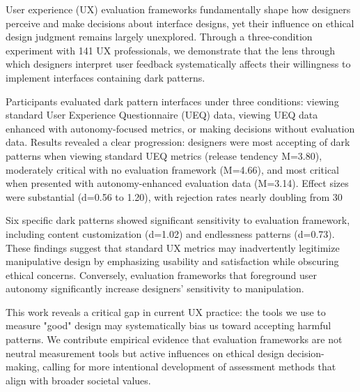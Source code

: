 
User experience (UX) evaluation frameworks fundamentally shape how designers perceive and make decisions about interface designs, yet their influence on ethical design judgment remains largely unexplored. Through a three-condition experiment with 141 UX professionals, we demonstrate that the lens through which designers interpret user feedback systematically affects their willingness to implement interfaces containing dark patterns. 

Participants evaluated dark pattern interfaces under three conditions: viewing standard User Experience Questionnaire (UEQ) data, viewing UEQ data enhanced with autonomy-focused metrics, or making decisions without evaluation data. Results revealed a clear progression: designers were most accepting of dark patterns when viewing standard UEQ metrics (release tendency M=3.80), moderately critical with no evaluation framework (M=4.66), and most critical when presented with autonomy-enhanced evaluation data (M=3.14). Effect sizes were substantial (d=0.56 to 1.20), with rejection rates nearly doubling from 30%

Six specific dark patterns showed significant sensitivity to evaluation framework, including content customization (d=1.02) and endlessness patterns (d=0.73). These findings suggest that standard UX metrics may inadvertently legitimize manipulative design by emphasizing usability and satisfaction while obscuring ethical concerns. Conversely, evaluation frameworks that foreground user autonomy significantly increase designers' sensitivity to manipulation.

This work reveals a critical gap in current UX practice: the tools we use to measure "good" design may systematically bias us toward accepting harmful patterns. We contribute empirical evidence that evaluation frameworks are not neutral measurement tools but active influences on ethical design decision-making, calling for more intentional development of assessment methods that align with broader societal values.

